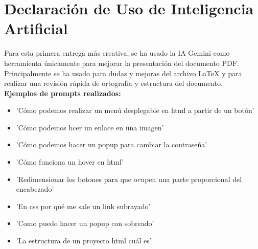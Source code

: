 \documentclass[10pt]{article}
\begin{document}
	
	\section{Declaración de Uso de Inteligencia Artificial}
	Para esta primera entrega más creativa, se ha usado la IA Gemini como herramienta únicamente para mejorar la presentación del documento PDF. \\
	Principalmente se ha usado para dudas y mejoras del archivo LaTeX y para realizar una revisión rápida de ortografía y estructura del documento.\\
	
	\textbf{Ejemplos de prompts realizados:}
	\begin{itemize}
		\item 'Cómo podemos realizar un menú desplegable en html a partir de un botón'
		\item 'Cómo podemos hcer un enlace en una imagen'
		\item 'Cómo podemos hacer un popup para cambiar la contraseña'
		\item 'Cómo funciona un hover en html'
		\item 'Redimensionar los botones para que ocupen una parte proporcional del encabezado'
		\item 'En css por qué me sale un link subrayado'
		\item 'Como puedo hacer un popup con sobreado'
		\item 'La estructura de un proyecto html cuál es'

	\end{itemize}
	
	
\end{document}
